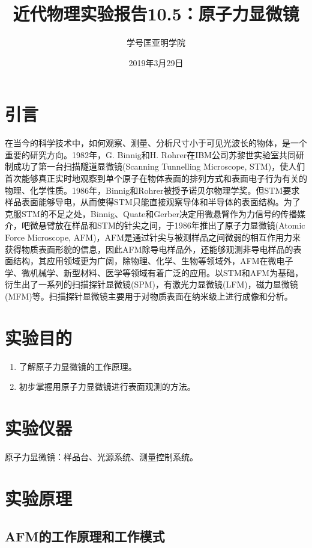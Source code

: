\documentclass[a4paper]{article}
\title{近代物理实验报告10.5：原子力显微镜}
\author{\quad 学号\quad 匡亚明学院}
\date{2019年3月29日}
\begin{document}
\maketitle

\tableofcontents

\newpage



\section{引言}
在当今的科学技术中，如何观察、测量、分析尺寸小于可见光波长的物体，是一个重要的研究方向。1982年，G. Binnig和H. Rohrer在IBM公司苏黎世实验室共同研制成功了第一台扫描隧道显微镜(Scanning Tunnelling Microscope, STM)，使人们首次能够真正实时地观察到单个原子在物体表面的排列方式和表面电子行为有关的物理、化学性质。1986年，Binnig和Rohrer被授予诺贝尔物理学奖。但STM要求样品表面能够导电，从而使得STM只能直接观察导体和半导体的表面结构。为了克服STM的不足之处，Binnig、Quate和Gerber决定用微悬臂作为力信号的传播媒介，吧微悬臂放在样品和STM的针尖之间，于1986年推出了原子力显微镜(Atomic Force Microscope, AFM)，AFM是通过针尖与被测样品之间微弱的相互作用力来获得物质表面形貌的信息，因此AFM除导电样品外，还能够观测非导电样品的表面结构，其应用领域更为广阔，除物理、化学、生物等领域外，AFM在微电子学、微机械学、新型材料、医学等领域有着广泛的应用。以STM和AFM为基础，衍生出了一系列的扫描探针显微镜(SPM)，有激光力显微镜(LFM)，磁力显微镜(MFM)等。扫描探针显微镜主要用于对物质表面在纳米级上进行成像和分析。

\section{实验目的}
\begin{enumerate}
\item 了解原子力显微镜的工作原理。
\item 初步掌握用原子力显微镜进行表面观测的方法。
\end{enumerate}

\section{实验仪器}
原子力显微镜：样品台、光源系统、测量控制系统。

\section{实验原理}
\subsection{AFM的工作原理和工作模式}
\end{document}
